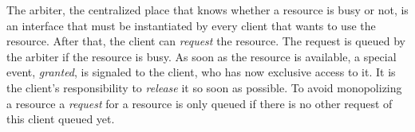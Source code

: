 The arbiter, the centralized place that knows whether a resource is busy or not, is an interface that must be instantiated by every client that wants to use the resource. After that, the client can \textit{request} the resource. The request is queued by the arbiter if the resource is busy. As soon as the resource is available, a special event, \textit{granted}, is signaled to the client, who has now exclusive access to it. It is the client's responsibility to \textit{release} it so soon as possible.
To avoid monopolizing a resource a \textit{request} for a resource is only queued if there is no other request of this client queued yet.


